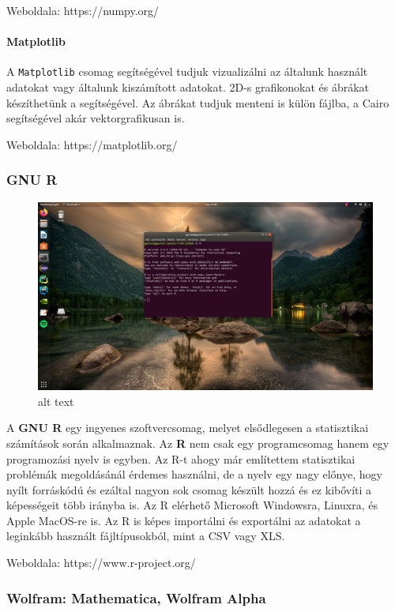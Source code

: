 Weboldala: https://numpy.org/

\paragraph{Matplotlib}\label{matplotlib}

A \texttt{Matplotlib} csomag segítségével tudjuk vizualizálni az
általunk használt adatokat vagy általunk kiszámított adatokat. 2D-s
grafikonokat és ábrákat készíthetünk a segítségével. Az ábrákat tudjuk
menteni is külön fájlba, a Cairo segítségével akár vektorgrafikusan is.

Weboldala: https://matplotlib.org/

    \subsubsection{GNU R}\label{gnu-r}

    \begin{figure}
\centering
\includegraphics{img/R_screen.png}
\caption{alt text}
\end{figure}

A \textbf{GNU R} egy ingyenes szoftvercsomag, melyet elsődlegesen a
statisztikai számítások során alkalmaznak. Az \textbf{R} nem csak egy
programcsomag hanem egy programozási nyelv is egyben. Az R-t ahogy már
említettem statisztikai problémák megoldásánál érdemes használni, de a
nyelv egy nagy előnye, hogy nyílt forráskódú és ezáltal nagyon sok
csomag készült hozzá és ez kibővíti a képességeit több irányba is. Az R
elérhető Microsoft Windowsra, Linuxra, és Apple MacOS-re is. Az R is
képes importálni és exportálni az adatokat a leginkább használt
fájltípusokból, mint a CSV vagy XLS.

Weboldala: https://www.r-project.org/

    \subsubsection{Wolfram: Mathematica, Wolfram
Alpha}\label{wolfram-mathematica-wolfram-alpha}

